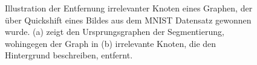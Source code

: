 \begin{figure}[t]
\centering
{}
\hspace{1cm}
\caption[Entfernung irrelevanter Knoten]{Illustration der Entfernung irrelevanter Knoten eines Graphen, der über Quickshift eines Bildes aus dem \gls{MNIST} Datensatz gewonnen wurde.
(a) zeigt den Ursprungsgraphen der Segmentierung, wohingegen der Graph in (b) irrelevante Knoten, die den Hintergrund beschreiben, entfernt.}
\label{fig:knotenentfernung}
\end{figure}
